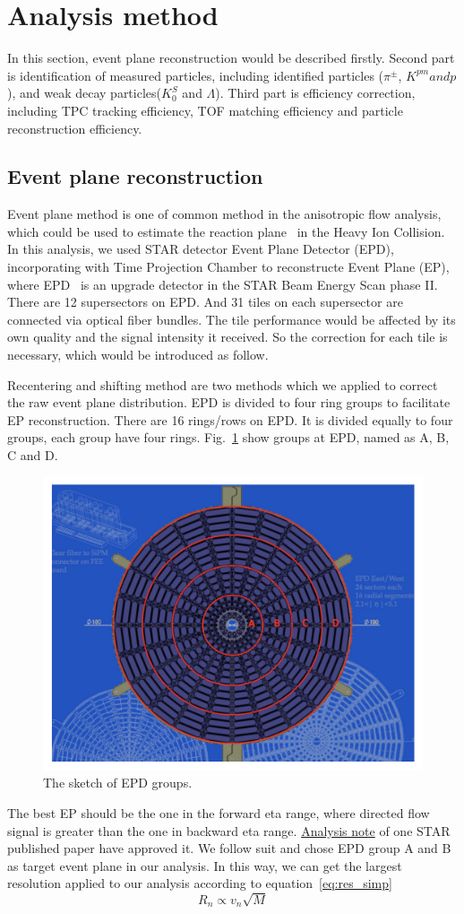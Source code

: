 
\section{Analysis method}
In this section, event plane reconstruction would be described firstly.
Second part is identification of measured particles, including identified particles ($\pi^{\pm}$, $K^{pm} and p$), 
and weak decay particles($K_0^S$ and $\Lambda$). Third part is efficiency correction, 
including TPC tracking efficiency, TOF matching efficiency and particle reconstruction efficiency.


\subsection{Event plane reconstruction}
Event plane method is one of common method in the anisotropic flow analysis, which could be used to estimate
the reaction plane~\cite{PhysRevC.83.044913} in the Heavy Ion Collision. In this analysis, we used STAR detector 
Event Plane Detector (EPD), incorporating with Time Projection Chamber to reconstructe Event Plane (EP), 
where EPD~\cite{ADAMS2020163970} is an upgrade detector in the STAR Beam Energy Scan phase II. There are 12 supersectors
on EPD. And 31 tiles on each supersector are connected via optical fiber bundles.
The tile performance would be affected by its own quality and the signal intensity it received.
So the correction for each tile is necessary, which would be introduced as follow.

Recentering and shifting method are two methods which we applied to correct the raw event plane
distribution. EPD is divided to four ring groups to facilitate EP reconstruction. There are 16 rings/rows
on EPD. It is divided equally to four groups, each group have four rings. 
Fig.~\ref{fig:EPDgroup} show groups at EPD, named as A, B, C and D.
\begin{figure}[hbt!]
\centering
\includegraphics[width=0.45\linewidth]{figures/chapter02/EPDgroup.png}
\caption{The sketch of EPD groups.}
\label{fig:EPDgroup}
\end{figure}
The best EP should be the one in the forward eta range, where directed flow
signal is greater than the one in backward eta range. \href{https://drupal.star.bnl.gov/STAR/system/files/FXT3gev_note_v4.pdf}{Analysis note} of one STAR published paper have approved it. 
We follow suit and chose EPD group A and B as target event plane in our analysis.
In this way, we can get the largest resolution applied to our analysis according to equation~\ref{eq:res_simp}
\begin{equation}
    R_n \propto v_n \sqrt{M}
\label{eq:res_simp}
\end{equation}

